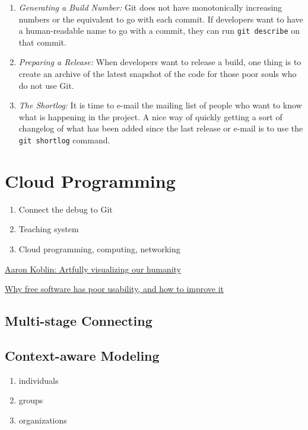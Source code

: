 \documentclass[draftclsnofoot,journal,onecolumn,12pt]{IEEEtran}
\begin{document}
\begin{enumerate}
  \item \textit{Generating a Build Number:} Git does not have monotonically increasing numbers or the equivalent to go with each commit. If developers want to have a human-readable name to go with a commit, they can run \texttt{git describe} on that commit.
  \item \textit{Preparing a Release:} When developers want to release a build, one thing is to create an archive of the latest snapshot of the code for those poor souls who do not use Git.
  \item \textit{The Shortlog:} It is time to e-mail the mailing list of people who want to know what is happening in the project. A nice way of quickly getting a sort of changelog of what has been added since the last release or e-mail is to use the \texttt{git shortlog} command.
\end{enumerate}

\section{Cloud Programming}

\begin{enumerate}
  \item Connect the debug to Git
  \item Teaching system
  \item Cloud programming, computing, networking
\end{enumerate}

\href{http://www.ted.com/talks/aaron_koblin.html}{Aaron Koblin: Artfully visualizing our humanity}

\href{http://www.mpt.net.nz/2012/06/why-free-software-has-poor-usability/}{Why free software has poor usability, and how to improve it}

\subsection{Multi-stage Connecting}

\subsection{Context-aware Modeling}


\begin{enumerate}
  \item individuals
  \item groups
  \item organizations
\end{enumerate}
\end{document}
